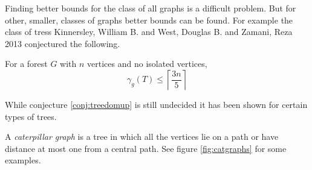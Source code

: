 
Finding better bounds for the class of all graphs is a difficult problem. But for other, smaller, classes of graphs better bounds can be found. For example the class of tress
Kinnersley, William B. and West, Douglas B. and Zamani, Reza 2013 \cite{KiWeZa2013} conjectured the following. 
\begin{conjecture} \label{conj:treedomup}
    For a forest $G$ with $n$ vertices and no isolated vertices,    
    \[ \gamma_g(T) \leq \left\lceil \frac{3n}{5} \right\rceil\]
\end{conjecture}
While conjecture \ref{conj:treedomup} is still undecided it has been shown for certain types of trees. 

A \textit{caterpillar graph} is a tree in which all the vertices lie on a path or have distance at most one from a central path. See figure \ref{fig:catgraphs} for some examples.
%
